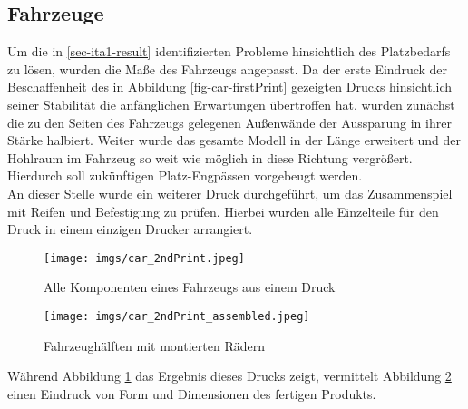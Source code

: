 \documentclass[.../Dokumentation.tex]{subfiles}
\begin{document}
\subsection{Fahrzeuge}\label{sec-ita2-cars}
Um die in \ref{sec-ita1-result} identifizierten Probleme hinsichtlich des 
Platzbedarfs zu lösen, wurden die Maße des Fahrzeugs angepasst.
Da der erste Eindruck der Beschaffenheit des in Abbildung 
\ref{fig-car-firstPrint} gezeigten Drucks hinsichtlich seiner Stabilität 
die anfänglichen Erwartungen übertroffen hat, wurden zunächst die zu den Seiten 
des Fahrzeugs gelegenen Außenwände der Aussparung in ihrer Stärke halbiert.
Weiter wurde das gesamte Modell in der Länge erweitert und der Hohlraum im 
Fahrzeug so weit wie möglich in diese Richtung vergrößert. Hierdurch soll 
zukünftigen Platz-Engpässen vorgebeugt werden.\\
An dieser Stelle wurde ein weiterer Druck durchgeführt, um das 
Zusammenspiel mit Reifen und Befestigung zu prüfen. Hierbei wurden alle 
Einzelteile für den Druck in einem einzigen Drucker arrangiert.
\begin{figure}[H]
\begin{center}
    \texttt{[image: imgs/car\_2ndPrint.jpeg]}
    \caption{Alle Komponenten eines Fahrzeugs aus einem Druck}
    \label{fig-car-2ndPrint}
\end{center}
\end{figure}
\begin{figure}[H]
\begin{center}
    \texttt{[image: imgs/car\_2ndPrint\_assembled.jpeg]}
    \vspace*{-2.75cm}
    \caption{Fahrzeughälften mit montierten Rädern}
    \label{fig-car-2ndPrint-assembled}
\end{center}
\end{figure}
\noindent
Während Abbildung \ref{fig-car-2ndPrint} das Ergebnis dieses Drucks zeigt, 
vermittelt Abbildung \ref{fig-car-2ndPrint-assembled} einen Eindruck 
von Form und Dimensionen des fertigen Produkts.
\end{document}

